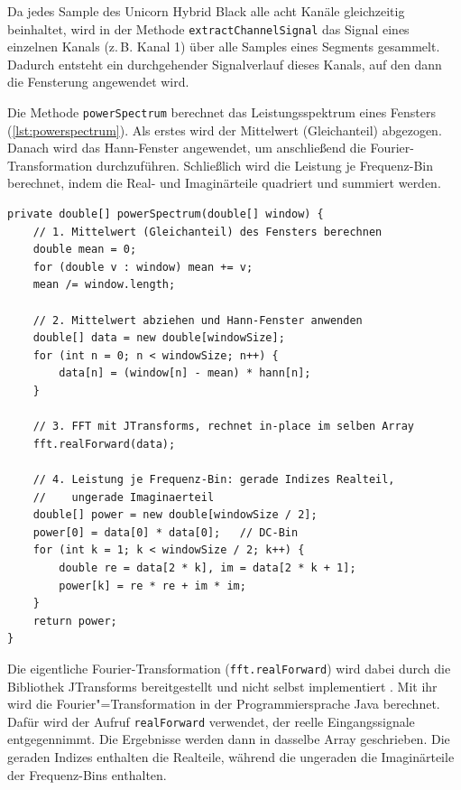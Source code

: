 \noindent Da jedes Sample des Unicorn Hybrid Black alle acht Kanäle gleichzeitig beinhaltet, wird in der Methode \texttt{extractChannelSignal} das Signal eines einzelnen Kanals (z.\,B. Kanal 1) über alle Samples eines Segments gesammelt. Dadurch entsteht ein durchgehender Signalverlauf dieses Kanals, auf den dann die Fensterung angewendet wird.

\newpage

\noindent Die Methode \texttt{powerSpectrum} berechnet das Leistungsspektrum eines Fensters (\autoref{lst:powerspectrum}). Als erstes wird der Mittelwert (Gleichanteil) abgezogen. Danach wird das Hann-Fenster angewendet, um anschließend die Fourier-Transformation durchzuführen. Schließlich wird die Leistung je Frequenz-Bin berechnet, indem die Real- und Imaginärteile quadriert und summiert werden.
\begin{lstlisting}[style=code, caption={[Leistungsspektrum eines Fensters]Berechnung des Leistungsspektrums eines Fensters. Vor der Transformation werden der Gleichanteil entfernt und das Hann-Fenster angewendet.}, label={lst:powerspectrum}]
private double[] powerSpectrum(double[] window) {
    // 1. Mittelwert (Gleichanteil) des Fensters berechnen
    double mean = 0;
    for (double v : window) mean += v;
    mean /= window.length;

    // 2. Mittelwert abziehen und Hann-Fenster anwenden
    double[] data = new double[windowSize];
    for (int n = 0; n < windowSize; n++) {
        data[n] = (window[n] - mean) * hann[n];
    }

    // 3. FFT mit JTransforms, rechnet in-place im selben Array
    fft.realForward(data);

    // 4. Leistung je Frequenz-Bin: gerade Indizes Realteil,
    //    ungerade Imaginaerteil
    double[] power = new double[windowSize / 2];
    power[0] = data[0] * data[0];   // DC-Bin
    for (int k = 1; k < windowSize / 2; k++) {
        double re = data[2 * k], im = data[2 * k + 1];
        power[k] = re * re + im * im;
    }
    return power;
}
\end{lstlisting}

\noindent Die eigentliche Fourier-Transformation (\texttt{fft.realForward}) wird dabei durch die Bibliothek JTransforms bereitgestellt und nicht selbst implementiert \autocite{jtransforms}. Mit ihr wird die Fourier"=Transformation in der Programmiersprache Java berechnet. Dafür wird der Aufruf \texttt{real\-Forward} verwendet, der reelle Eingangssignale entgegennimmt. Die Ergebnisse werden dann in dasselbe Array geschrieben. Die geraden Indizes enthalten die Realteile, während die ungeraden die Imaginärteile der Frequenz-Bins enthalten.
\newpage


